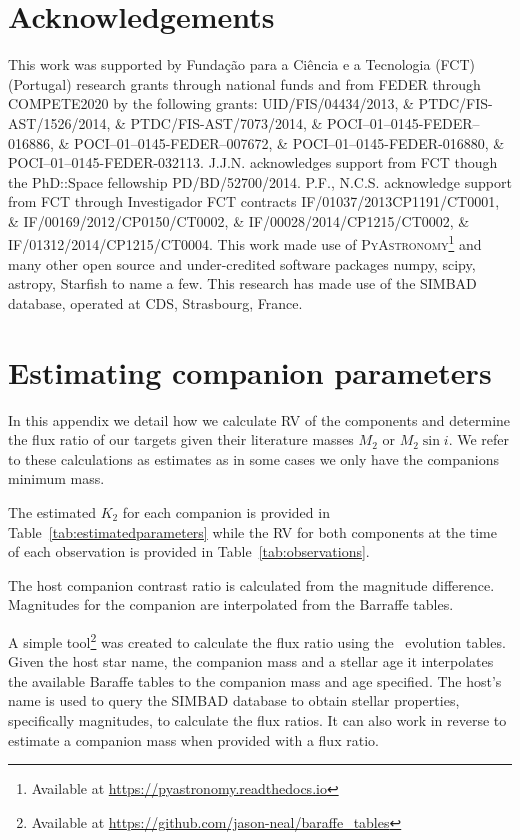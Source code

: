 \documentclass[fleqn,usenatbib]{mnras}
\newcommand*\bl{\color{blue}}
\begin{document}
\section*{Acknowledgements}
This work was supported by Funda\c{c}\~ao para a Ci\^encia e a Tecnologia (FCT) (Portugal) research grants through national funds and from FEDER through COMPETE2020 by the following grants: UID/FIS/04434/2013, \&  PTDC/FIS-AST/1526/2014, \& PTDC/FIS-AST/7073/2014, \& POCI--01--0145-FEDER--016886, \& POCI--01--0145-FEDER--007672, \& POCI--01--0145-FEDER-016880, \& POCI--01--0145-FEDER-032113.
J.J.N. acknowledges support from FCT though the PhD::Space fellowship PD/BD/52700/2014.
P.F., N.C.S. acknowledge support from FCT through Investigador FCT contracts IF/01037/2013CP1191/CT0001, \& IF/00169/2012/CP0150/CT0002, \& IF/00028/2014/CP1215/CT0002, \& IF/01312/2014/CP1215/CT0004.
This work made use of \textsc{PyAstronomy}\footnote{Available at \href{https://pyastronomy.readthedocs.io}{https://pyastronomy.readthedocs.io}} and many other open source and under-credited software packages numpy, scipy, astropy, Starfish to name a few.
This research has made use of the SIMBAD database, operated at CDS, Strasbourg, France.




\appendix

    


    \section{Estimating companion parameters}
    In this appendix we detail how we calculate RV of the components and determine the flux ratio of our targets given their literature masses \(M_2\) or \(M_{2}\sin{i}\). We refer to these calculations as estimates as in some cases we only have the companions minimum mass.

    The estimated \(K_2\) for each companion is provided in Table~\ref{tab:estimatedparameters} while the RV for both components at the time of each observation is provided in Table~\ref{tab:observations}.



    {\bl The host companion contrast ratio is calculated from the magnitude difference. Magnitudes for the companion are interpolated from the Barraffe tables.
        
    A simple tool\footnote{Available at \url{https://github.com/jason-neal/baraffe_tables}} was created to calculate the flux ratio using the~\citep{baraffe_evolutionary_2003,baraffe_new_2015} evolution tables. Given the host star name, the companion mass and a stellar age it interpolates the available Baraffe tables to the companion mass and age specified. The host's name is used to query the {SIMBAD} database to obtain stellar properties, specifically magnitudes, to calculate the flux ratios. It can also work in reverse to estimate a companion mass when provided with a flux ratio.}

\bsp{}	%
\label{lastpage}
\end{document}
